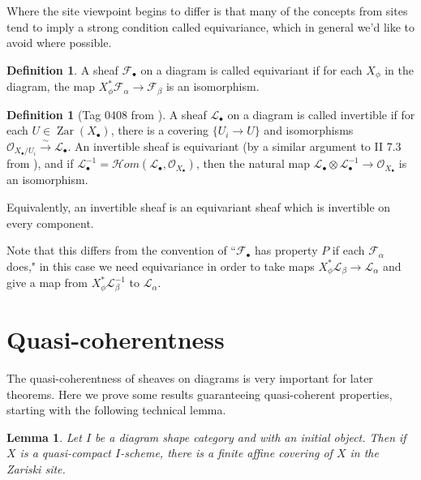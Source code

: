 \documentclass[proquest]{uwthesis}[2014/11/13]
\newtheorem{lemma}[theorem]{Lemma}
\theoremstyle{definition}
\newtheorem{definition}[theorem]{Definition}
\newcommand{\cHom}{\mathcal{H} \textit{om}}
\DeclareMathOperator{\Zar}{Zar}
\newcommand{\FF}{\mathscr{F}}
\newcommand{\LL}{\mathcal{L}}
\newcommand{\OO}{\mathcal{O}}
\begin{document}
Where the site viewpoint begins to differ is that many of the concepts from sites tend to imply a strong condition called equivariance, which in general we'd like to avoid where possible.

\begin{definition}
	A sheaf $\FF_\bullet$ on a diagram is called equivariant if for each $X_\phi$ in the diagram, the map $X_\phi^*\FF_\alpha \rightarrow \FF_\beta$ is an isomorphism.
\end{definition}

\begin{definition}[Tag 0408 from \cite{stacks}]
	A sheaf $\LL_\bullet$ on a diagram is called invertible if for each $U \in \Zar(X_\bullet)$, there is a covering $\{U_i \rightarrow U\}$ and isomorphisms $\OO_{X_\bullet/U_i} \xrightarrow{\sim} \LL_\bullet$.
	An invertible sheaf is equivariant (by a similar argument to II 7.3 from \cite{Lipman2009}), and if $\LL_\bullet^{-1} = \cHom(\LL_\bullet, \OO_{X_\bullet})$, then the natural map $\LL_\bullet \otimes \LL_\bullet^{-1} \rightarrow \OO_{X_\bullet}$ is an isomorphism.
	
	Equivalently, an invertible sheaf is an equivariant sheaf which is invertible on every component.
\end{definition}

Note that this differs from the convention of ``$\FF_\bullet$ has property $P$ if each $\FF_\alpha$ does," in this case we need equivariance in order to take maps $X_\phi^* \LL_\beta \rightarrow \LL_\alpha$ and give a map from $X_\phi^* \LL_\beta^{-1}$ to $\LL_\alpha$.

\section{Quasi-coherentness}

The quasi-coherentness of sheaves on diagrams is very important for later theorems.
Here we prove some results guaranteeing quasi-coherent properties, starting with the following technical lemma.

	
\begin{lemma}
	\label{lem:affinecover}
	Let $I$ be a diagram shape category and with an initial object.
	Then if $X$ is a quasi-compact $I$-scheme, there is a finite affine covering of $X$ in the Zariski site.
\end{lemma}
\end{document}
